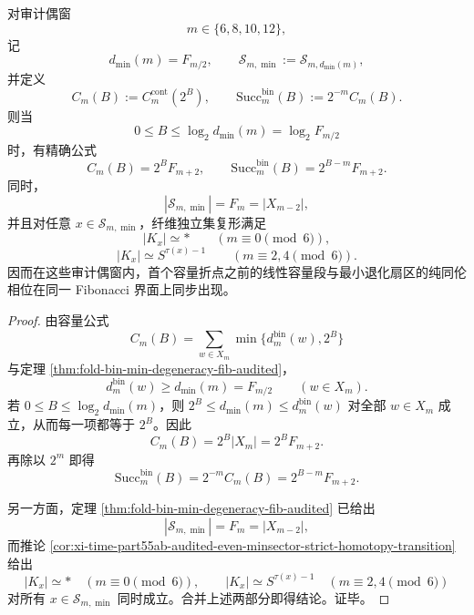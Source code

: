 \begin{theorem}[审计偶窗首折点的同伦纯化]\label{thm:conclusion-audited-even-firstkink-homotopy-purification}
对审计偶窗
\[
m\in\{6,8,10,12\},
\]
记
\[
d_{\min}(m)=F_{m/2},
\qquad
\mathcal S_{m,\min}:=\mathcal S_{m,d_{\min}(m)},
\]
并定义
\[
C_m(B):=C_m^{\mathrm{cont}}(2^B),
\qquad
\mathrm{Succ}^{\mathrm{bin}}_m(B):=2^{-m}C_m(B).
\]
则当
\[
0\le B\le \log_2 d_{\min}(m)=\log_2 F_{m/2}
\]
时，有精确公式
\[
C_m(B)=2^B F_{m+2},
\qquad
\mathrm{Succ}^{\mathrm{bin}}_m(B)=2^{B-m}F_{m+2}.
\]
同时，
\[
|\mathcal S_{m,\min}|=F_m=|X_{m-2}|,
\]
并且对任意 \(x\in \mathcal S_{m,\min}\)，纤维独立集复形满足
\[
|K_x|\simeq *
\qquad (m\equiv 0\!\!\!\pmod 6),
\]
\[
|K_x|\simeq S^{\tau(x)-1}
\qquad (m\equiv 2,4\!\!\!\pmod 6).
\]
因而在这些审计偶窗内，首个容量折点之前的线性容量段与最小退化扇区的纯同伦相位在同一 Fibonacci 界面上同步出现。
\end{theorem}
\begin{proof}
由容量公式
\[
C_m(B)=\sum_{w\in X_m}\min\{d_m^{\mathrm{bin}}(w),2^B\}
\]
与定理 \ref{thm:fold-bin-min-degeneracy-fib-audited}，
\[
d_m^{\mathrm{bin}}(w)\ge d_{\min}(m)=F_{m/2}
\qquad (w\in X_m).
\]
若 \(0\le B\le \log_2 d_{\min}(m)\)，则 \(2^B\le d_{\min}(m)\le d_m^{\mathrm{bin}}(w)\) 对全部 \(w\in X_m\) 成立，从而每一项都等于 \(2^B\)。因此
\[
C_m(B)=2^B|X_m|=2^BF_{m+2}.
\]
再除以 \(2^m\) 即得
\[
\mathrm{Succ}^{\mathrm{bin}}_m(B)=2^{-m}C_m(B)=2^{B-m}F_{m+2}.
\]

另一方面，定理 \ref{thm:fold-bin-min-degeneracy-fib-audited} 已给出
\[
|\mathcal S_{m,\min}|=F_m=|X_{m-2}|,
\]
而推论 \ref{cor:xi-time-part55ab-audited-even-minsector-strict-homotopy-transition} 给出
\[
|K_x|\simeq *
\quad (m\equiv0\!\!\!\pmod6),
\qquad
|K_x|\simeq S^{\tau(x)-1}
\quad (m\equiv2,4\!\!\!\pmod6)
\]
对所有 \(x\in\mathcal S_{m,\min}\) 同时成立。合并上述两部分即得结论。证毕。
\end{proof}
